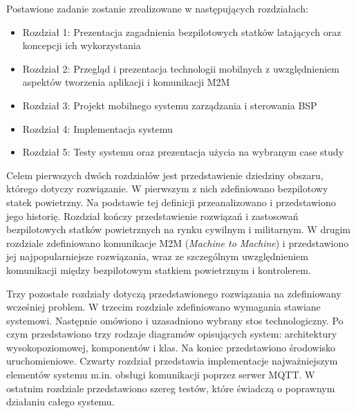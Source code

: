 Postawione zadanie zostanie zrealizowane w następujących rozdziałach:
\begin{itemize}
  \item Rozdział 1: Prezentacja zagadnienia bezpilotowych statków latających oraz koncepcji ich wykorzystania
  \item Rozdział 2: Przegląd i prezentacja technologii mobilnych z uwzględnieniem aspektów tworzenia aplikacji i komunikacji M2M
  \item Rozdział 3: Projekt mobilnego systemu zarządzania i sterowania BSP
  \item Rozdział 4: Implementacja systemu
  \item Rozdział 5: Testy systemu oraz prezentacja użycia na wybranym case study
\end{itemize}

Celem pierwszych dwóch rozdziałów jest przedstawienie dziedziny obszaru, którego dotyczy rozwiązanie. W pierwszym z nich zdefiniowano bezpilotowy statek powietrzny. Na podstawie tej definicji przeanalizowano i przedstawiono jego historię. Rozdział kończy przedstawienie rozwiązań i zastosowań bezpilotowych statków powietrznych na rynku cywilnym i militarnym. W drugim rozdziale zdefiniowano komunikacje M2M (\textit{Machine to Machine}) i przedstawiono jej najpopularniejsze rozwiązania, wraz ze szczególnym uwzględnieniem komunikacji między bezpilotowym statkiem powietrznym i kontrolerem.

Trzy pozostałe rozdziały dotyczą przedstawionego rozwiązania na zdefiniowany wcześniej problem. W trzecim rozdziale zdefiniowano wymagania stawiane systemowi. Następnie omówiono i uzasadniono wybrany stos technologiczny. Po czym przedstawiono trzy rodzaje diagramów opisujących system: architektury wysokopoziomowej, komponentów i klas. Na koniec przedstawiono środowisko uruchomieniowe. Czwarty rozdział przedstawia implementacje najważniejszym elementów systemu m.in. obsługi komunikacji poprzez serwer MQTT. W ostatnim rozdziale przedstawiono szereg testów, które świadczą o poprawnym działaniu całego systemu.



    


\clearpage

